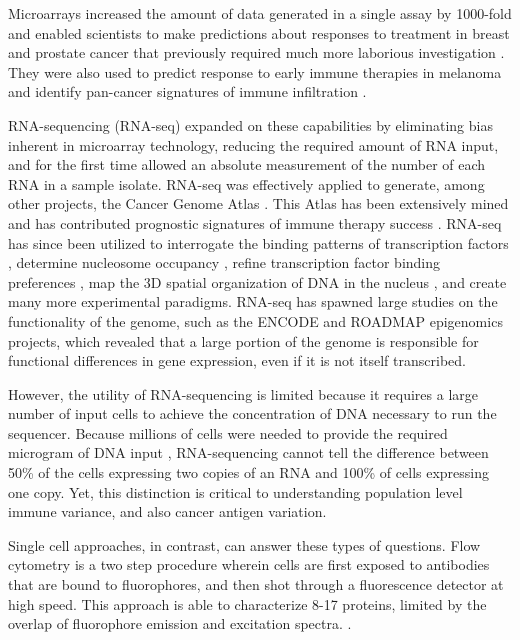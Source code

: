 Microarrays increased the amount of data generated in a single assay by 1000-fold and enabled scientists to make predictions about responses to treatment in breast and prostate cancer that previously required much more laborious investigation \citep{Glinsky2004, VantVeer2002}. 
They were also used to predict response to early immune therapies in melanoma \citep{Monsurro2004} and identify pan-cancer signatures of immune infiltration \citep{Chifman2016}.

RNA-sequencing (RNA-seq) expanded on these capabilities by eliminating bias inherent in microarray technology, reducing the required amount of RNA input, and for the first time allowed an absolute measurement of the number of each RNA in a sample isolate.
RNA-seq was effectively applied to generate, among other projects, the Cancer Genome Atlas \citep{McLendon2008,Network2011}.
This Atlas has been extensively mined and has contributed prognostic signatures of immune therapy success \citep{Senbabaoglu2016}.
RNA-seq has since been utilized to interrogate the binding patterns of transcription factors \citep{Johnson2007}, determine nucleosome occupancy \citep{Boyle2008}, refine transcription factor binding preferences \citep{Riley2014}, map the 3D spatial organization of DNA in the nucleus \citep{Belton2012}, and create many more experimental paradigms.
RNA-seq has spawned large studies on the functionality of the genome, such as the ENCODE and ROADMAP epigenomics projects, which revealed that a large portion of the genome is responsible for functional differences in gene expression, even if it is not itself transcribed. %

However, the utility of RNA-sequencing is limited because it requires a large number of input cells to achieve the concentration of DNA necessary to run the sequencer.
Because millions of cells were needed to provide the required microgram of DNA input \citep{Wilhelm2009}, RNA-sequencing cannot tell the difference between 50\% of the cells expressing two copies of an RNA and 100\% of cells expressing one copy. 
Yet, this distinction is critical to understanding population level immune variance, and also cancer antigen variation. 

Single cell approaches, in contrast, can answer these types of questions. 
Flow cytometry is a two step procedure wherein cells are first exposed to antibodies that are bound to fluorophores, and then shot through a fluorescence detector at high speed. 
This approach is able to characterize 8-17 proteins, limited by the overlap of fluorophore emission and excitation spectra. \citep{Perfetto2004}.

